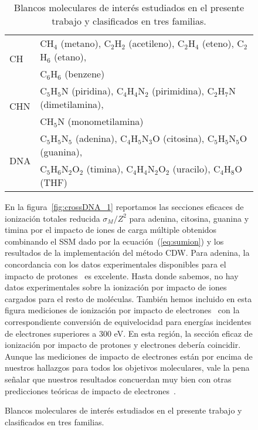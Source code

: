 \begin{figure}
\begin{table}[t]
\begin{center}
\begin{tabular}{|p{}|p{}|}
\hline
\multirow{2}{*}{CH} & CH$_4$ (metano), C$_2$H$_2$ (acetileno), 
C$_2$H$_4$ (eteno), C$_2$H$_6$ (etano), \\ & C$_6$H$_6$ (benzene) \\
\hline
\multirow{2}{*}{CHN} & C$_5$H$_5$N (piridina), C$_4$H$_4$N$_2$ (pirimidina), 
C$_2$H$_7$N (dimetilamina), \\ & CH$_5$N (monometilamina) \\
\hline
\multirow{4}{*}{DNA} & C$_5$H$_5$N$_5$ (adenina), C$_4$H$_5$N$_3$O (citosina), 
C$_5$H$_5$N$_5$O (guanina), \\ & C$_5$H$_6$N$_2$O$_2$ (timina),
C$_4$H$_4$N$_2$O$_2$ (uracilo), C$_4$H$_8$O (THF) \\
\hline
\end{tabular}
\caption[Blancos moleculares estudiados y clasificados en tres familias.]
{Blancos moleculares de interés estudiados en el presente trabajo y 
clasificados en tres familias.}
\label{tab:families}
\end{center}
\end{table}

En la figura~\ref{fig:crossDNA_1} reportamos las secciones eficaces de 
ionización totales reducida $\sigma_M/Z^2$ para adenina, citosina, 
guanina y timina por el impacto de iones de carga múltiple obtenidos 
combinando el SSM dado por la ecuación~(\ref{eq:sumion}) y los 
resultados de la implementación del método CDW. Para adenina, la 
concordancia con los datos experimentales disponibles para el impacto 
de protones~\cite{iriki2011} es excelente. Hasta donde sabemos, no hay 
datos experimentales sobre la ionización por impacto de iones cargados 
para el resto de moléculas. También hemos incluido en esta figura 
mediciones de ionización por impacto de electrones~\cite{rahman2016} 
con la correspondiente conversión de equivelocidad para energías 
incidentes de electrones superiores a 300 eV. En esta región, la 
sección eficaz de ionización por impacto de protones y electrones 
debería coincidir. Aunque las mediciones de impacto de electrones están 
por encima de nuestros hallazgos para todos los objetivos moleculares, 
vale la pena señalar que nuestros resultados concuerdan muy bien con 
otras predicciones teóricas de impacto de 
electrones~\cite{mozejko2003,tan2018}. 


\end{figure}
